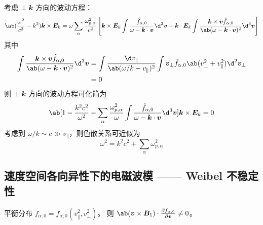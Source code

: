 考虑 $\perp\bm{k}$ 方向的波动方程：
\begin{equation}\begin{aligned}
\ab(\frac{\omega^2}{c^2} - k^2) \vector{k}\times\vector{E}_k
= \omega \sum_\alpha \frac{\omega_{p,\alpha}^2}{c^2}
\left[
\vector{k}\times\vector{E}_k \int
\frac{\hat{f}_{\alpha,0}}{\omega - \vector{k}\cdot\vector{v}}
\d^3\vector{v}
+ \vector{k} \cdot \vector{E}_k \int
\frac{\vector{k}\times\vector{v} \hat{f}_{\alpha,0}}
{\ab(\omega - \vector{k}\cdot\vector{v})^2}
\d^3\vector{v}
\right]
\end{aligned}\end{equation}
其中
\begin{equation}\begin{aligned}
\int
\frac{\vector{k}\times\vector{v} \hat{f}_{\alpha,0}}
{\ab(\omega - \vector{k}\cdot\vector{v})^2}
\d^3\vector{v}
&= \int
\frac{\d v_\parallel}{\ab(\omega/k - v_\parallel)^2}
\int \vector{v}_\perp \hat{f}_{\alpha,0}\ab(v_\perp^2 + v_\parallel^2)
\d^2\vector{v}_\perp \\
&= 0
\end{aligned}\end{equation}
则 $\perp\bm{k}$ 方向的波动方程可化简为
\begin{equation}
\ab[
    1 - \frac{k^2 c^2}{\omega^2}
    - \sum_\alpha \frac{\omega_{p,\alpha}^2}{\omega}
    \int
    \frac{\hat{f}_{\alpha,0}}{\omega - \vector{k}\cdot\vector{v}}
    \d^3\vector{v}
]
\vector{k}\times\vector{E}_k = 0
\end{equation}
考虑到 $\omega/k \sim c \gg v_\parallel$，则色散关系可近似为
\begin{equation}
\omega^2 = k^2 c^2 + \sum_\alpha \omega_{p,\alpha}^2
\end{equation}

\subsection{速度空间各向异性下的电磁波模 —— Weibel 不稳定性}

平衡分布 $f_{\alpha,0} = f_{\alpha,0}(v_\parallel^2, v_\perp^2)$。
则 $\ab(\vector{v}\times\vector{B}_1)\cdot\pdv{f_{\alpha,0}}{\vector{v}}\neq0$。

